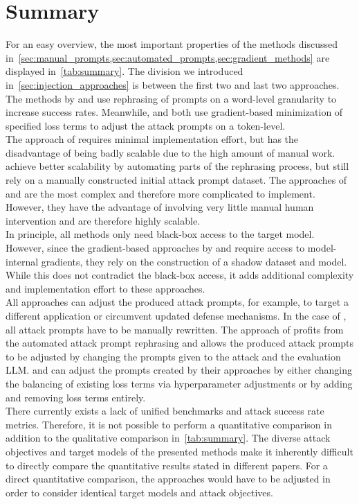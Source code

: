 \section{Summary}
For an easy overview, the most important properties of the methods discussed in~\cref{sec:manual_prompts,sec:automated_prompts,sec:gradient_methods} are displayed in~\cref{tab:summary}.
The division we introduced in~\cref{sec:injection_approaches} is between the first two and last two approaches.
The methods by \perez and \deng use rephrasing of prompts on a word-level granularity to increase success rates.
Meanwhile, \hui and \shi both use gradient-based minimization of specified loss terms to adjust the attack prompts on a token-level.\\

The approach of \perez requires minimal implementation effort, but has the disadvantage of being badly scalable due to the high amount of manual work.
\deng achieve better scalability by automating parts of the rephrasing process, but still rely on a manually constructed initial attack prompt dataset.
The approaches of \hui and \shi are the most complex and therefore more complicated to implement.
However, they have the advantage of involving very little manual human intervention and are therefore highly scalable.\\

In principle, all methods only need black-box access to the target model.
However, since the gradient-based approaches by \shi and \hui require access to model-internal gradients, they rely on the construction of a shadow dataset and model.
While this does not contradict the black-box access, it adds additional complexity and implementation effort to these approaches.\\

All approaches can adjust the produced attack prompts, for example, to target a different application or circumvent updated defense mechanisms.
In the case of \perez, all attack prompts have to be manually rewritten.
The approach of \deng profits from the automated attack prompt rephrasing and allows the produced attack prompts to be adjusted by changing the prompts given to the attack and the evaluation LLM.
\hui and \shi can adjust the prompts created by their approaches by either changing the balancing of existing loss terms via hyperparameter adjustments or by adding and removing loss terms entirely.\\

There currently exists a lack of unified benchmarks and attack success rate metrics.
Therefore, it is not possible to perform a quantitative comparison in addition to the qualitative comparison in~\cref{tab:summary}.
The diverse attack objectives and target models of the presented methods make it inherently difficult to directly compare the quantitative results stated in different papers.
For a direct quantitative comparison, the approaches would have to be adjusted in order to consider identical target models and attack objectives.

